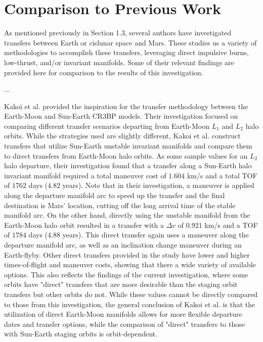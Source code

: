 \section{Comparison to Previous Work}
As mentioned previously in Section 1.3, several authors have investigated transfers between Earth
or cislunar space and Mars. These studies us a variety of methodologies to accomplish these
transfers, leveraging direct impulsive burns, low-thrust, and/or invariant manifolds. Some of their
relevant findings are provided here for comparison to the results of this investigation.

...

Kakoi et al. provided the inspiration for the transfer methodology between the Earth-Moon and
Sun-Earth CR3BP models\cite{Kakoi:2014,Kakoi:2015}. Their investigation focused on comparing
different transfer scenarios departing from Earth-Moon $L_{1}$ and $L_{2}$ halo orbits. While the
strategies used are slightly different, Kakoi et al. construct transfers that utilize Sun-Earth
unstable invariant manifolds and compare them to direct transfers from Earth-Moon halo orbits. As
some sample values for an $L_{2}$ halo departure, their investigation found that a transfer along a
Sun-Earth halo invariant manifold required a total maneuver cost of $1.604$ km/s and a total TOF of
$1762$ days ($4.82$ years). Note that in their investigation, a maneuver is applied along the
departure manifold arc to speed up the transfer and the final destination is Mars' location,
cutting off the long arrival time of the stable manifold arc. On the other hand, directly using the
unstable manifold from the Earth-Moon halo orbit resulted in a transfer with a $\Delta v$ of
$0.921$ km/s and a TOF of $1784$ days ($4.88$ years)\cite{Kakoi:2015}. This direct transfer again
uses a maneuver along the departure manifold arc, as well as an inclination change maneuver during
an Earth-flyby. Other direct transfers provided in the study have lower and higher times-of-flight
and maneuver costs, showing that there a wide variety of available options. This also reflects the
findings of the current investigation, where some orbits have "direct" transfers that are more
desirable than the staging orbit transfers but other orbits do not. While these values cannot be
directly compared to those from this investigation, the general conclusion of Kakoi et al. is that
the utilization of direct Earth-Moon manifolds allows for more flexible departure dates and
transfer options, while the comparison of "direct" transfers to those with Sun-Earth staging orbits
is orbit-dependent.
